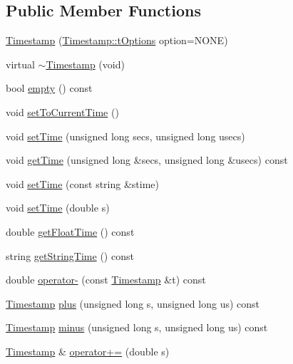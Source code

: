 \subsection*{Public Member Functions}
\begin{DoxyCompactItemize}
\item 
\hyperlink{classDUtils_1_1Timestamp_a7edd67789d60b27acbee7f591ed3e2da}{Timestamp} (\hyperlink{classDUtils_1_1Timestamp_a5a8a3cb7f9e0f73bf11fce42688b06c8}{Timestamp\+::t\+Options} option=N\+O\+NE)
\item 
virtual \hyperlink{classDUtils_1_1Timestamp_a06ea20fe67d9e7177818ba219ea3137f}{$\sim$\+Timestamp} (void)
\item 
bool \hyperlink{classDUtils_1_1Timestamp_a0aaa878aee63c543dea866892c003a62}{empty} () const
\item 
void \hyperlink{classDUtils_1_1Timestamp_ae27c920f3833c104096213c6fb17f4d8}{set\+To\+Current\+Time} ()
\item 
void \hyperlink{classDUtils_1_1Timestamp_a439bcff577f3ae30e8918897ecb33e76}{set\+Time} (unsigned long secs, unsigned long usecs)
\item 
void \hyperlink{classDUtils_1_1Timestamp_a15e5c1a751a3faef596437a69d4c3d88}{get\+Time} (unsigned long \&secs, unsigned long \&usecs) const
\item 
void \hyperlink{classDUtils_1_1Timestamp_ac35ad9d35e9ce5ff6fea159e9b060bf0}{set\+Time} (const string \&stime)
\item 
void \hyperlink{classDUtils_1_1Timestamp_a797856da2823ee26814151ea97aea5e1}{set\+Time} (double s)
\item 
double \hyperlink{classDUtils_1_1Timestamp_a360ea9b3a339c315f1a1eb2416787088}{get\+Float\+Time} () const
\item 
string \hyperlink{classDUtils_1_1Timestamp_af1db3a964b6a7b88e73f7bd3110efd79}{get\+String\+Time} () const
\item 
double \hyperlink{classDUtils_1_1Timestamp_ac7f07414867eaa6bea6acd7b41e9f60c}{operator-\/} (const \hyperlink{classDUtils_1_1Timestamp}{Timestamp} \&t) const
\item 
\hyperlink{classDUtils_1_1Timestamp}{Timestamp} \hyperlink{classDUtils_1_1Timestamp_aaee4b5b30d2130e622636350c1332fcf}{plus} (unsigned long s, unsigned long us) const
\item 
\hyperlink{classDUtils_1_1Timestamp}{Timestamp} \hyperlink{classDUtils_1_1Timestamp_a5777e11b3f04827e2c310c0ab147e5bf}{minus} (unsigned long s, unsigned long us) const
\item 
\hyperlink{classDUtils_1_1Timestamp}{Timestamp} \& \hyperlink{classDUtils_1_1Timestamp_a609bb289c3833fd6c26c9ee831074a11}{operator+=} (double s)

\end{DoxyCompactItemize}

